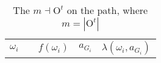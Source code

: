 \documentclass[12pt,letter]{article}
\newcommand{\Omicron}{\mathrm{O}}
\theoremstyle{definition}
\theoremstyle{remark}
\theoremstyle{claim}
\begin{document}
\begin{landscape}
\begin{table}[!htbp]
\caption{The $m\dashv\Omicron^t$ on the path, where $m=|\Omicron^t|$}
\label{table:eqm_path_ot2}
\begin{center}
\begin{tabular}{c c | c | c | c}
$\omega_i$ 	 & 	   &	$f(\omega_i)$  &	$a_{G_i}$ & $\lambda(\omega_i,a_{G_i})$ \\

\end{tabular}
\end{center}
\end{table}
\end{landscape}
\end{document}
